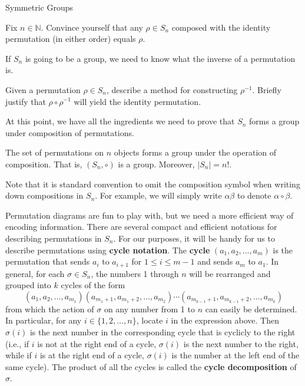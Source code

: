 \begin{section}{Symmetric Groups}
\begin{problem}
Fix $n\in\mathbb{N}$.  Convince yourself that any $\rho\in S_n$ composed with the identity permutation (in either order) equals $\rho$.
\end{problem}

If $S_n$ is going to be a group, we need to know what the inverse of a permutation is.

\begin{problem}
Given a permutation $\rho\in S_n$, describe a method for constructing $\rho^{-1}$.  Briefly justify that $\rho \circ \rho^{-1}$ will yield the identity permutation.
\end{problem}

At this point, we have all the ingredients we need to prove that $S_n$ forms a group under composition of permutations.

\begin{theorem}
The set of permutations on $n$ objects forms a group under the operation of composition.  That is, $(S_n,\circ)$ is a group.  Moreover, $|S_n|=n!$.
\end{theorem}

Note that it is standard convention to omit the composition symbol when writing down compositions in $S_n$.  For example, we will simply write $\alpha\beta$ to denote $\alpha \circ \beta$.

Permutation diagrams are fun to play with, but we need a more efficient way of encoding information.  There are several compact and efficient notations for describing permutations in $S_n$. For our purposes, it will be handy for us to describe permutations using \textbf{cycle notation}. The \textbf{cycle} $(a_1,a_2,\ldots, a_m)$ is the permutation that sends $a_i$ to $a_{i+1}$ for $1\leq i\leq m-1$ and sends $a_m$ to $a_1$. In general, for each $\sigma\in S_n$, the numbers 1 through $n$ will be rearranged and grouped into $k$ cycles of the form
\[
(a_1,a_2,\ldots, a_{m_1})(a_{m_1+1},a_{m_1+2},\ldots,a_{m_2})\cdots (a_{m_{k-1}+1},a_{m_{k-1}+2},\ldots,a_{m_k})
\]
from which the action of $\sigma$ on any number from 1 to $n$ can easily be determined.  In particular, for any $i\in\{1,2,\ldots,n\}$, locate $i$ in the expression above.  Then $\sigma(i)$ is the next number in the corresponding cycle that is cyclicly to the right (i.e., if $i$ is not at the right end of a cycle, $\sigma(i)$ is the next number to the right, while if $i$ is at the right end of a cycle, $\sigma(i)$ is the number at the left end of the same cycle). The product of all the cycles is called the \textbf{cycle decomposition} of $\sigma$.  


\end{section}
